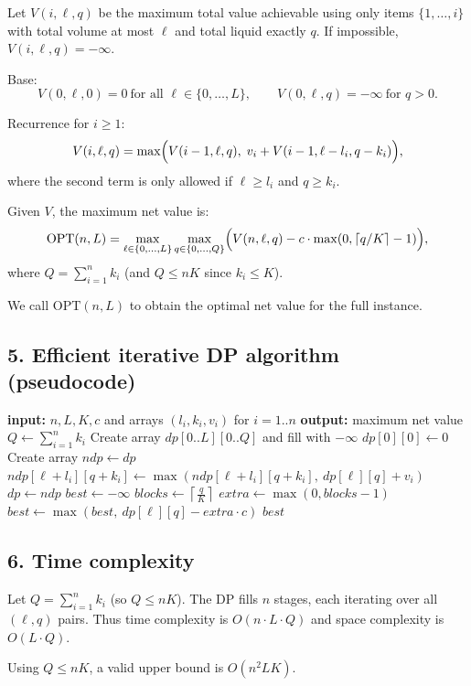 \documentclass[a4paper,11pt]{article}
\begin{document}
	Let $V(i,\ell,q)$ be the maximum total value achievable using only items $\{1,\dots,i\}$ with
	total volume at most $\ell$ and total liquid exactly $q$.
	If impossible, $V(i,\ell,q)=-\infty$.

	Base:
	\[
	V(0,\ell,0)=0 \ \text{for all } \ell \in \{0,\dots,L\},\qquad
	V(0,\ell,q)=-\infty \ \text{for } q>0.
	\]

	Recurrence for $i\ge 1$:
	\[
	V(i,\ell,q) =
	\max\Bigl(
	V(i-1,\ell,q), \;
	v_i + V(i-1,\ell-l_i,q-k_i)
	\Bigr),
	\]
	where the second term is only allowed if $\ell\ge l_i$ and $q\ge k_i$.

	Given $V$, the maximum net value is:
	\[
	\mathrm{OPT}(n,L)=
	\max_{\ell \in \{0,\dots,L\}}
	\max_{q \in \{0,\dots,Q\}}
	\Bigl(
	V(n,\ell,q) - c\cdot \max(0,\lceil q/K\rceil - 1)
	\Bigr),
	\]
	where $Q=\sum_{i=1}^n k_i$ (and $Q \le nK$ since $k_i \le K$).

	We call $\mathrm{OPT}(n,L)$ to obtain the optimal net value for the full instance.

	\subsection{5. Efficient iterative DP algorithm (pseudocode)}
	\begin{algorithm}[H]
		\caption{Maximum net value with liquid cost blocks}
		\begin{algorithmic}[1]
			\State \textbf{input:} $n,L,K,c$ and arrays $(l_i,k_i,v_i)$ for $i=1..n$
			\State \textbf{output:} maximum net value
			\State $Q \gets \sum_{i=1}^n k_i$
			\State Create array $dp[0..L][0..Q]$ and fill with $-\infty$
			\State $dp[0][0] \gets 0$
			\State Create array $ndp \gets dp$ 
			\State $ndp[\ell + l_i][q + k_i] \gets \max(ndp[\ell + l_i][q + k_i],\ dp[\ell][q] + v_i)$
			\EndIf
			\EndIf
			\EndFor
			\EndFor
			\State $dp \gets ndp$
			\EndFor
			\State $best \gets -\infty$
			\State $blocks \gets \left\lceil \frac{q}{K} \right\rceil$ 
			\State $extra \gets \max(0, blocks - 1)$
			\State $best \gets \max(best,\ dp[\ell][q] - extra \cdot c)$
			\EndIf
			\EndFor
			\EndFor
			\State \Return $best$
		\end{algorithmic}
	\end{algorithm}

	\subsection{6. Time complexity}
	Let $Q=\sum_{i=1}^n k_i$ (so $Q \le nK$). The DP fills $n$ stages, each iterating over all $(\ell,q)$ pairs.
	Thus time complexity is $O(n\cdot L \cdot Q)$ and space complexity is $O(L\cdot Q)$.

	Using $Q \le nK$, a valid upper bound is $O(n^2 L K)$.
\end{document}
